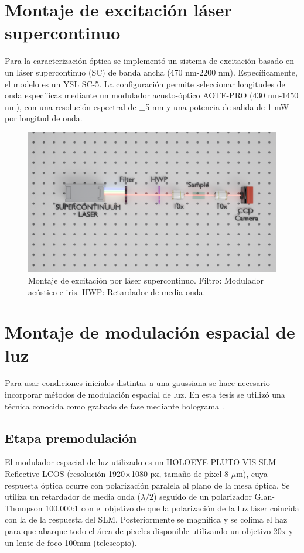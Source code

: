 \section{Montaje de excitación láser supercontinuo \label{cap:wavelength}}

Para la caracterización óptica se implementó un sistema de excitación basado en un láser supercontinuo (SC) de banda ancha (470 nm-2200 nm). Específicamente, el modelo es un YSL SC-5. La configuración permite seleccionar longitudes de onda específicas mediante un modulador acusto-óptico AOTF-PRO (430 nm-1450 nm), con una resolución espectral de $\pm$5 nm y una potencia de salida de 1 mW por longitud de onda.

\begin{figure}[H]
    \centering
    \includegraphics[width=\linewidth, trim={5cm 9cm 3cm 7cm},clip]{media/SC_setup}
    \caption[Montaje de excitación por láser supercontinuo.]{Montaje de excitación por láser supercontinuo. Filtro: Modulador acústico e iris. HWP: Retardador de media onda.}
\end{figure}

\section{Montaje de modulación espacial de luz}

Para usar condiciones iniciales distintas a una gaussiana se hace necesario incorporar métodos de modulación espacial de luz. En esta tesis se utilizó una técnica conocida como grabado de fase mediante holograma \citep{terhalle}.

\subsection{Etapa premodulación}
El modulador espacial de luz utilizado es un HOLOEYE PLUTO-VIS SLM - Reflective LCOS (resolución 1920$\times$1080 px, tamaño de píxel 8 $\mu$m), cuya respuesta óptica ocurre con polarización paralela al plano de la mesa óptica. Se utiliza un retardador de media onda ($\lambda/2$) seguido de un polarizador Glan-Thompson 100.000:1 con el objetivo de que la polarización de la luz láser coincida con la de la respuesta del SLM. Posteriormente se magnifica y se colima el haz para que abarque todo el área de pixeles disponible utilizando un objetivo 20x y un lente de foco 100mm (telescopio).

